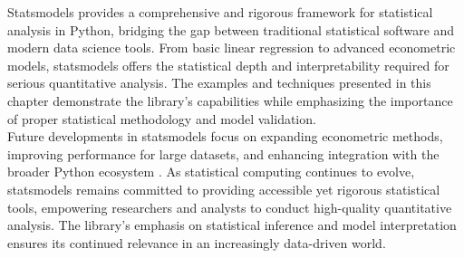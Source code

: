 Statsmodels provides a comprehensive and rigorous framework for statistical analysis in Python, bridging the gap between traditional statistical software and modern data science tools. From basic linear regression to advanced econometric models, statsmodels offers the statistical depth and interpretability required for serious quantitative analysis. The examples and techniques presented in this chapter demonstrate the library's capabilities while emphasizing the importance of proper statistical methodology and model validation.\\

Future developments in statsmodels focus on expanding econometric methods, improving performance for large datasets, and enhancing integration with the broader Python ecosystem \cite{Perktold:2023}. As statistical computing continues to evolve, statsmodels remains committed to providing accessible yet rigorous statistical tools, empowering researchers and analysts to conduct high-quality quantitative analysis. The library's emphasis on statistical inference and model interpretation ensures its continued relevance in an increasingly data-driven world.